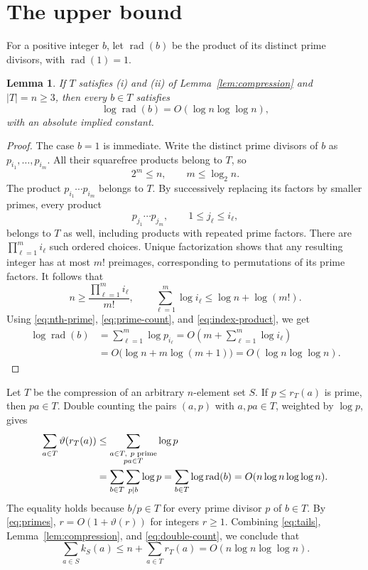 \documentclass[11pt,a4paper]{article}
\newtheorem{lemma}{Lemma}
\newcommand{\rad}{\operatorname{rad}}
\begin{document}
\newpage
\section{The upper bound}

For a positive integer $b$, let $\rad(b)$ be the product of its distinct prime divisors, with $\rad(1)=1$.

\begin{lemma}\label{lem:radical}
If $T$ satisfies (i) and (ii) of Lemma~\ref{lem:compression} and $|T|=n\ge3$, then every $b\in T$ satisfies
\[
\log\rad(b)=O(\log n\log\log n),
\]
with an absolute implied constant.
\end{lemma}

\begin{proof}
The case $b=1$ is immediate.
Write the distinct prime divisors of $b$ as $p_{i_1},\ldots,p_{i_m}$.
All their squarefree products belong to $T$, so
\begin{equation}\label{eq:prime-count}
2^m\le n,\qquad m\le\log_2 n.
\end{equation}
The product $p_{i_1}\cdots p_{i_m}$ belongs to $T$.
By successively replacing its factors by smaller primes, every product
\[
p_{j_1}\cdots p_{j_m},\qquad 1\le j_\ell\le i_\ell,
\]
belongs to $T$ as well, including products with repeated prime factors.
There are $\prod_{\ell=1}^m i_\ell$ such ordered choices.
Unique factorization shows that any resulting integer has at most $m!$ preimages, corresponding to permutations of its prime factors.
It follows that
\begin{equation}\label{eq:index-product}
n\ge\frac{\prod_{\ell=1}^m i_\ell}{m!},
\qquad
\sum_{\ell=1}^m\log i_\ell\le\log n+\log(m!).
\end{equation}
Using \eqref{eq:nth-prime}, \eqref{eq:prime-count}, and \eqref{eq:index-product}, we get
\begin{align*}
\log\rad(b)
&=\sum_{\ell=1}^m\log p_{i_\ell}
=O\!\left(m+\sum_{\ell=1}^m\log i_\ell\right)\\
&=O\bigl(\log n+m\log(m+1)\bigr)
=O(\log n\log\log n).
\end{align*}
\end{proof}

Let $T$ be the compression of an arbitrary $n$-element set $S$.
If $p\le r_T(a)$ is prime, then $pa\in T$.
Double counting the pairs $(a,p)$ with $a,pa\in T$, weighted by $\log p$, gives
\begin{align}
\sum_{a\in T}\vartheta(r_T(a))
&\le \sum_{\substack{a\in T,\ p\text{ prime}\\pa\in T}}\log p\notag\\
&=\sum_{b\in T}\sum_{p\mid b}\log p
=\sum_{b\in T}\log\rad(b)
=O(n\log n\log\log n).\label{eq:double-count}
\end{align}
The equality holds because $b/p\in T$ for every prime divisor $p$ of $b\in T$.
By \eqref{eq:primes}, $r=O(1+\vartheta(r))$ for integers $r\ge1$.
Combining \eqref{eq:tails}, Lemma~\ref{lem:compression}, and \eqref{eq:double-count}, we conclude that
\[
\sum_{a\in S}k_S(a)
\le n+\sum_{a\in T}r_T(a)
=O(n\log n\log\log n).
\]
\end{document}
